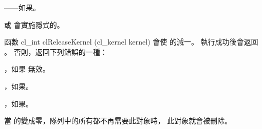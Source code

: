 \item {}——如果\schostfailres。
\stopigBase

 或  會實施隱式的。

函數
\startclc
cl_int clReleaseKernel (cl_kernel kernel)
\stopclc
會使  的減一。
執行成功後會返回 。
否則，返回下列錯誤的一種：
\startigBase
\item {}，如果  無效。

\item {}，如果\scdevfailres。

\item {}，如果\schostfailres。
\stopigBase

當  的變成零，隊列中的所有都不再需要此對象時，
此對象就會被刪除。

